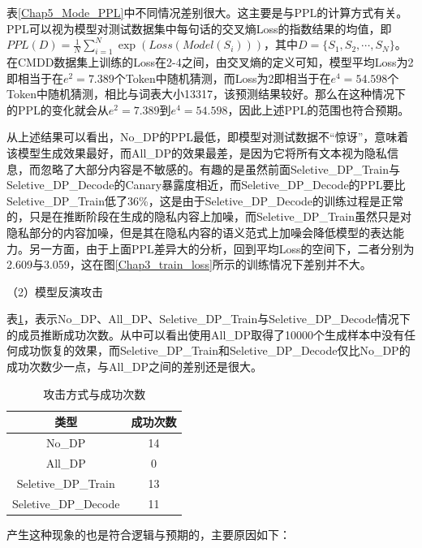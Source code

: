 表\ref{Chap5_Mode_PPL}中不同情况差别很大。这主要是与PPL的计算方式有关。PPL可以视为模型对测试数据集中每句话的交叉熵Loss的指数结果的均值，即$PPL(D)=\frac{1}{N}\sum_{i=1}^{N}\exp(Loss(Model(S_i)))$，其中$D=\{S_1,S_2,\cdots, S_N\}$。在CMDD数据集上训练的Loss在2-4之间，由交叉熵的定义可知，模型平均Loss为2即相当于在$e^2=7.389$个Token中随机猜测，而Loss为2即相当于在$e^4=54.598$个Token中随机猜测，相比与词表大小13317，该预测结果较好。那么在这种情况下的PPL的变化就会从$e^2=7.389$到$e^4=54.598$，因此上述PPL的范围也符合预期。

从上述结果可以看出，No\_DP的PPL最低，即模型对测试数据不“惊讶”，意味着该模型生成效果最好，而All\_DP的效果最差，是因为它将所有文本视为隐私信息，而忽略了大部分内容是不敏感的。有趣的是虽然前面Seletive\_DP\_Train与Seletive\_DP\_Decode的Canary暴露度相近，而Seletive\_DP\_Decode的PPL要比Seletive\_DP\_Train低了36\%，这是由于Seletive\_DP\_Decode的训练过程是正常的，只是在推断阶段在生成的隐私内容上加噪，而Seletive\_DP\_Train虽然只是对隐私部分的内容加噪，但是其在隐私内容的语义范式上加噪会降低模型的表达能力。另一方面，由于上面PPL差异大的分析，回到平均Loss的空间下，二者分别为2.609与3.059，这在图\ref{Chap3_train_loss}所示的训练情况下差别并不大。

（2）模型反演攻击



表\ref{Chap5_Mem_Infer_Number}，表示No\_DP、All\_DP、Seletive\_DP\_Train与Seletive\_DP\_Decode情况下的成员推断成功次数。从中可以看出使用All\_DP取得了10000个生成样本中没有任何成功恢复的效果，而Seletive\_DP\_Train和Seletive\_DP\_Decode仅比No\_DP的成功次数少一点，与All\_DP之间的差别还是很大。

\begin{table}[]
	\centering
	\caption{攻击方式与成功次数}
	\begin{tabular}{|c|c|}
		\hline
		类型&成功次数   \\ \hline
		No\_DP& 14    \\ \hline
		All\_DP& 0   \\ \hline
		Seletive\_DP\_Train&13    \\ \hline
		Seletive\_DP\_Decode&11    \\ \hline
	\end{tabular}
	\label{Chap5_Mem_Infer_Number}
\end{table}

产生这种现象的也是符合逻辑与预期的，主要原因如下：

